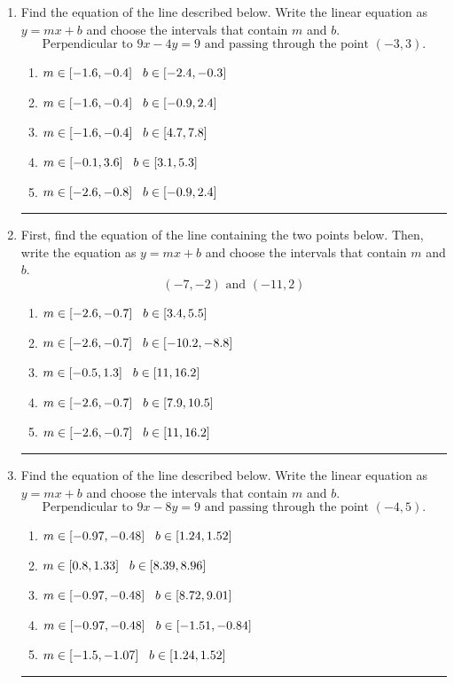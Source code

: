\documentclass[14pt]{extbook}
\newcommand{\litem}[1]{\item#1\hspace*{-1cm}\rule{\textwidth}{0.4pt}}
\begin{document}
\begin{enumerate}
\litem{
Find the equation of the line described below. Write the linear equation as $ y=mx+b $ and choose the intervals that contain $m$ and $b$.\[ \text{Perpendicular to } 9 x - 4 y = 9 \text{ and passing through the point } (-3, 3). \]\begin{enumerate}[label=\Alph*.]
\item \( m \in [-1.6, -0.4] \hspace*{3mm} b \in [-2.4, -0.3] \)
\item \( m \in [-1.6, -0.4] \hspace*{3mm} b \in [-0.9, 2.4] \)
\item \( m \in [-1.6, -0.4] \hspace*{3mm} b \in [4.7, 7.8] \)
\item \( m \in [-0.1, 3.6] \hspace*{3mm} b \in [3.1, 5.3] \)
\item \( m \in [-2.6, -0.8] \hspace*{3mm} b \in [-0.9, 2.4] \)

\end{enumerate} }
\litem{
First, find the equation of the line containing the two points below. Then, write the equation as $ y=mx+b $ and choose the intervals that contain $m$ and $b$.\[ (-7, -2) \text{ and } (-11, 2) \]\begin{enumerate}[label=\Alph*.]
\item \( m \in [-2.6, -0.7] \hspace*{3mm} b \in [3.4, 5.5] \)
\item \( m \in [-2.6, -0.7] \hspace*{3mm} b \in [-10.2, -8.8] \)
\item \( m \in [-0.5, 1.3] \hspace*{3mm} b \in [11, 16.2] \)
\item \( m \in [-2.6, -0.7] \hspace*{3mm} b \in [7.9, 10.5] \)
\item \( m \in [-2.6, -0.7] \hspace*{3mm} b \in [11, 16.2] \)

\end{enumerate} }
\litem{
Find the equation of the line described below. Write the linear equation as $ y=mx+b $ and choose the intervals that contain $m$ and $b$.\[ \text{Perpendicular to } 9 x - 8 y = 9 \text{ and passing through the point } (-4, 5). \]\begin{enumerate}[label=\Alph*.]
\item \( m \in [-0.97, -0.48] \hspace*{3mm} b \in [1.24, 1.52] \)
\item \( m \in [0.8, 1.33] \hspace*{3mm} b \in [8.39, 8.96] \)
\item \( m \in [-0.97, -0.48] \hspace*{3mm} b \in [8.72, 9.01] \)
\item \( m \in [-0.97, -0.48] \hspace*{3mm} b \in [-1.51, -0.84] \)
\item \( m \in [-1.5, -1.07] \hspace*{3mm} b \in [1.24, 1.52] \)


\end{enumerate}}
\end{enumerate}
\end{document}
